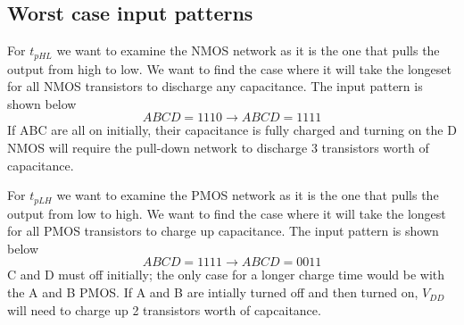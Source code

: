 \documentclass[12pt]{article}
\begin{document}
\subsection{Worst case input patterns}
For $t_{pHL}$ we want to examine the NMOS network as it is the one that pulls the output from high to low.
We want to find the case where it will take the longeset for all NMOS transistors to discharge any capacitance.
The input pattern is shown below
\[ABCD = 1110 \rightarrow ABCD = 1111\]
If ABC are all on initially, their capacitance is fully charged and turning on the D NMOS will require the pull-down network
to discharge 3 transistors worth of capacitance.

For $t_{pLH}$ we want to examine the PMOS network as it is the one that pulls the output from low to high.
We want to find the case where it will take the longest for all PMOS transistors to charge up capacitance.
The input pattern is shown below
\[ABCD = 1111 \rightarrow ABCD = 0011\]
C and D must off initially; the only case for a longer charge time would be with the A and B PMOS. If A and B are intially turned off
and then turned on, $V_{DD}$ will need to charge up 2 transistors worth of capcaitance.

\pagebreak
\end{document}
